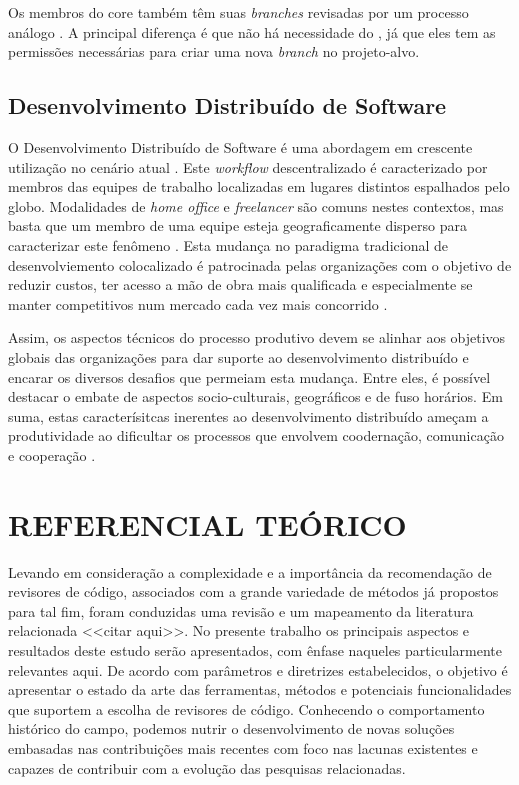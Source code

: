 \documentclass[12pt,openany,oneside,a4paper,english,brazil]{abntbibufjf}
\begin{document}
    Os membros do core também têm suas \textit{branches} revisadas por um processo análogo \cite{6385140,Bosu2014}. A principal diferença é que não há necessidade do , já que eles tem as permissões necessárias para criar uma nova \textit{branch} no projeto-alvo.

  \section{Desenvolvimento Distribuído de Software}\label{sec:dds}

  O Desenvolvimento Distribuído de Software é uma abordagem em crescente utilização no cenário atual \cite{mens2019}. Este \textit{workflow} descentralizado é caracterizado por membros das equipes de trabalho localizadas em lugares distintos espalhados pelo globo. Modalidades de \textit{home office} e \textit{freelancer} são comuns nestes contextos, mas basta que um membro de uma equipe esteja geograficamente disperso para caracterizar este fenômeno \cite{stadler2019}.  Esta mudança no paradigma tradicional de desenvolviemento colocalizado é patrocinada pelas organizações com o objetivo de reduzir custos, ter acesso a mão de obra mais qualificada e especialmente se manter competitivos num mercado cada vez mais concorrido \cite{herbsleb2001}.

  Assim, os aspectos técnicos do processo produtivo devem se alinhar aos objetivos globais das organizações para dar suporte ao desenvolvimento distribuído e encarar os diversos desafios que permeiam esta mudança. Entre eles, é possível destacar o embate de aspectos socio-culturais, geográficos e de fuso horários. Em suma, estas caracterísitcas inerentes ao desenvolvimento distribuído ameçam a produtividade ao dificultar os processos que envolvem coodernação, comunicação e cooperação \cite{carmel2001}.

\chapter{REFERENCIAL TEÓRICO}\label{chap:trabalhos_relacionados}

Levando em consideração a complexidade e a importância da recomendação de revisores de código, associados com a grande variedade de métodos já propostos para tal fim, foram conduzidas uma revisão e um mapeamento da literatura relacionada <<citar aqui>>. No presente trabalho os principais aspectos e resultados deste estudo serão apresentados, com ênfase naqueles particularmente relevantes aqui. De acordo com parâmetros e diretrizes estabelecidos, \cite{kitchenham2004} o objetivo é apresentar o estado da arte das ferramentas, métodos e potenciais funcionalidades que suportem a escolha de revisores de código. Conhecendo o comportamento histórico do campo, podemos nutrir o desenvolvimento de novas soluções embasadas nas contribuições mais recentes com foco nas lacunas existentes e capazes de contribuir com a evolução das pesquisas relacionadas.
\end{document}
